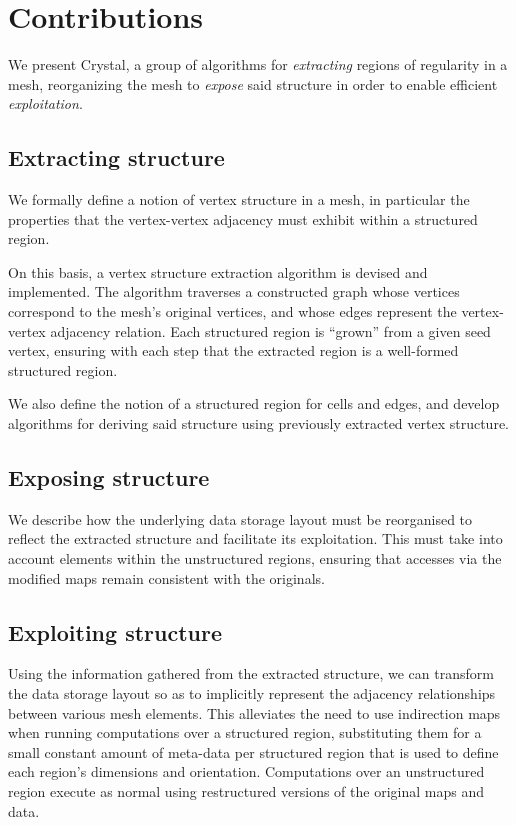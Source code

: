 \section{Contributions}

We present Crystal, a group of algorithms for \emph{extracting} regions of regularity in a mesh, reorganizing the mesh to \emph{expose} said structure in order to enable efficient \emph{exploitation}.




\subsection{Extracting structure}
We formally define a notion of vertex structure in a mesh, in particular the properties that the vertex-vertex adjacency must exhibit within a structured region.


On this basis, a vertex structure extraction algorithm is devised and implemented. The algorithm traverses a constructed graph whose vertices correspond to the mesh's original vertices, and whose edges represent the vertex-vertex adjacency relation. Each structured region is ``grown'' from a given seed vertex, ensuring with each step that the extracted region is a well-formed structured region.

We also define the notion of a structured region for cells and edges, and develop algorithms for deriving said structure using previously extracted vertex structure.


\subsection{Exposing structure}
We describe how the underlying data storage layout must be reorganised to reflect the extracted structure and facilitate its exploitation. This must take into account elements within the unstructured regions, ensuring that accesses via the modified maps remain consistent with the originals.

\subsection{Exploiting structure}
Using the information gathered from the extracted structure, we can transform the data storage layout so as to implicitly represent the adjacency relationships between various mesh elements. This alleviates the need to use indirection maps when running computations over a structured region, substituting them for a small constant amount of meta-data per structured region that is used to define each region's dimensions and orientation. Computations over an unstructured region execute as normal using restructured versions of the original maps and data.

